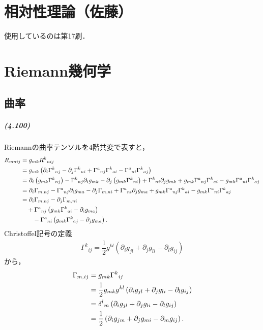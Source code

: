 \documentclass[a4paper]{ltjsreport}
\begin{document}
\chapter*{相対性理論（佐藤）}
使用しているのは第17刷．

\setcounter{chapter}{3}
\chapter{Riemann幾何学}
\setcounter{section}{4}
\section{曲率}
\paragraph{(4.100)}
Riemannの曲率テンソルを$4$階共変で表すと，
\begin{align}
  R_{mnij} &= g_{mk}{R^k}_{nij}\notag\\
  &= g_{mk}\left(\partial_i{\Gamma^k}_{nj} - \partial_j{\Gamma^k}_{ni} + {\Gamma^a}_{nj}{\Gamma^k}_{ai} - {\Gamma^a}_{ni}{\Gamma^k}_{aj}\right)\notag\\
  &= \partial_i\left(g_{mk}{\Gamma^k}_{nj}\right) - {\Gamma^k}_{nj}\partial_ig_{mk}  -
  \partial_j\left(g_{mk}{\Gamma^k}_{ni}\right) + {\Gamma^k}_{ni}\partial_jg_{mk} + g_{mk}{\Gamma^a}_{nj}{\Gamma^k}_{ai} - g_{mk}{\Gamma^a}_{ni}{\Gamma^k}_{aj}\notag\\
  &= \partial_i\Gamma_{m, nj} - {\Gamma^a}_{nj}\partial_ig_{ma}  -
  \partial_j\Gamma_{m, ni} + {\Gamma^a}_{ni}\partial_jg_{ma} + g_{mk}{\Gamma^a}_{nj}{\Gamma^k}_{ai} - g_{mk}{\Gamma^a}_{ni}{\Gamma^k}_{aj}\notag\\
  &= \partial_i\Gamma_{m, nj} - \partial_j\Gamma_{m, ni}\label{R1}\\
  &\quad + {\Gamma^a}_{nj}\left(g_{mk}{\Gamma^k}_{ai} - \partial_ig_{ma}\right)\label{R2}\\
  &\qquad - {\Gamma^a}_{ni}\left(g_{mk}{\Gamma^k}_{aj} - \partial_jg_{ma}\right) . \label{R3}
\end{align}
Christoffel記号の定義
\begin{align*}
  {\Gamma^k}_{ij}=\dfrac{1}{2}g^{kl}\left(\partial_ig_{jl} + \partial_jg_{li} - \partial_lg_{ij}\right)
\end{align*}
から，
\begin{align}
  \Gamma_{m, ij} &= g_{mk}{\Gamma^k}_{ij}\notag\\
  &= \dfrac{1}{2}g_{mk}g^{kl}\left(\partial_ig_{jl} + \partial_jg_{li} - \partial_lg_{ij}\right)\notag\\
  &= {\delta^l}_m\left(\partial_ig_{jl} + \partial_jg_{li} - \partial_lg_{ij}\right)\notag\\
  &= \dfrac{1}{2}\left(\partial_ig_{jm} + \partial_jg_{mi} - \partial_mg_{ij}\right) . \label{3cov}
\end{align}
\end{document}
